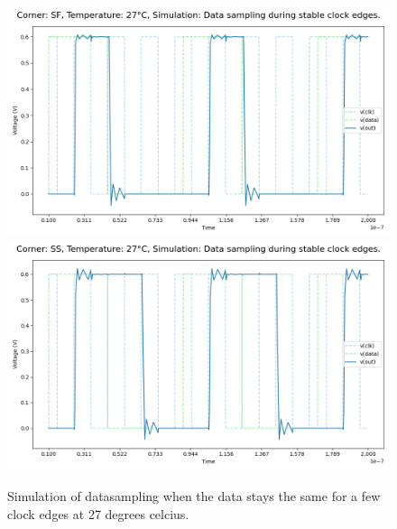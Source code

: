 \begin{figure}[H]
    \vspace{5pt}
    \includegraphics[height= 0.21\textheight]{figures/aimspice/SF27W2.png}
    \vspace{5pt}
    \includegraphics[height= 0.21\textheight]{figures/aimspice/SS27W2.png}
    \caption{Simulation of datasampling when the data stays the same for a few clock edges at 27 degrees celcius.}
    \label{fig:aimspice_W2_27}
\end{figure}

\pagebreak

